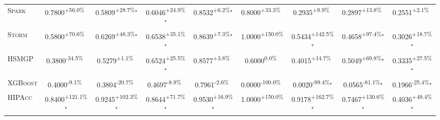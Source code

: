 \begin{table}[htbp]
\begin{tabular}{l|cccc|cccc}
\textsc{Spark} & \cellcolor{green!30}0.7800\textsuperscript{+56.0\%}$^{\,\,\,}$ & \cellcolor{green!30}0.5809\textsuperscript{+28.7\%}$^\star$ & \cellcolor{green!30}0.6046\textsuperscript{+24.9\%}$^\star$ & \cellcolor{green!30}0.8532\textsuperscript{+6.2\%}$^\star$ & \cellcolor{green!30}0.8000\textsuperscript{+33.3\%}$^{\,\,\,}$ & \cellcolor{green!30}0.2935\textsuperscript{+9.9\%}$^{\,\,\,}$ & \cellcolor{green!30}0.2897\textsuperscript{+13.8\%}$^{\,\,\,}$ & \cellcolor{green!30}0.2551\textsuperscript{+2.1\%}$^{\,\,\,}$ \\
\textsc{Storm} & \cellcolor{green!30}0.5800\textsuperscript{+70.6\%}$^{\,\,\,}$ & \cellcolor{green!30}0.6269\textsuperscript{+48.3\%}$^\star$ & \cellcolor{green!30}0.6538\textsuperscript{+35.1\%}$^\star$ & \cellcolor{green!30}0.8639\textsuperscript{+7.3\%}$^\star$ & \cellcolor{green!30}1.0000\textsuperscript{+150.0\%}$^{\,\,\,}$ & \cellcolor{green!30}0.5434\textsuperscript{+142.5\%}$^\star$ & \cellcolor{green!30}0.4658\textsuperscript{+97.4\%}$^\star$ & \cellcolor{green!30}0.3026\textsuperscript{+18.7\%}$^\star$ \\
\textsc{HSMGP} & \cellcolor{red!30}0.3800\textsuperscript{-34.5\%}$^{\,\,\,}$ & \cellcolor{green!30}0.5279\textsuperscript{+1.1\%}$^{\,\,\,}$ & \cellcolor{green!30}0.6524\textsuperscript{+25.5\%}$^\star$ & \cellcolor{green!30}0.8577\textsuperscript{+3.8\%}$^{\,\,\,}$ & \cellcolor{red!30}0.6000\textsuperscript{0.0\%}$^{\,\,\,}$ & \cellcolor{green!30}0.4015\textsuperscript{+14.7\%}$^{\,\,\,}$ & \cellcolor{green!30}0.5049\textsuperscript{+69.8\%}$^\star$ & \cellcolor{green!30}0.3335\textsuperscript{+27.5\%}$^\star$ \\
\textsc{XGBoost} & \cellcolor{red!30}0.4000\textsuperscript{-9.1\%}$^{\,\,\,}$ & \cellcolor{red!30}0.3804\textsuperscript{-20.7\%}$^{\,\,\,}$ & \cellcolor{red!30}0.4697\textsuperscript{-8.9\%}$^{\,\,\,}$ & \cellcolor{red!30}0.7961\textsuperscript{-2.6\%}$^{\,\,\,}$ & \cellcolor{red!30}0.0000\textsuperscript{-100.0\%}$^{\,\,\,}$ & \cellcolor{red!30}0.0020\textsuperscript{-99.4\%}$^\star$ & \cellcolor{red!30}0.0565\textsuperscript{-81.1\%}$^\star$ & \cellcolor{red!30}0.1966\textsuperscript{-25.4\%}$^\star$ \\
\textsc{HIPAcc} & \cellcolor{green!30}0.8400\textsuperscript{+121.1\%}$^\star$ & \cellcolor{green!30}0.9245\textsuperscript{+102.3\%}$^\star$ & \cellcolor{green!30}0.8644\textsuperscript{+71.7\%}$^\star$ & \cellcolor{green!30}0.9530\textsuperscript{+16.9\%}$^\star$ & \cellcolor{green!30}1.0000\textsuperscript{+150.0\%}$^{\,\,\,}$ & \cellcolor{green!30}0.9178\textsuperscript{+162.7\%}$^\star$ & \cellcolor{green!30}0.7467\textsuperscript{+130.6\%}$^\star$ & \cellcolor{green!30}0.4036\textsuperscript{+49.4\%}$^\star$ \\

\end{tabular}
\end{table}
